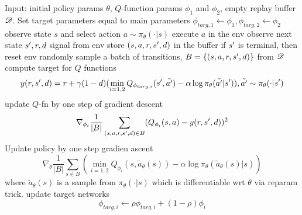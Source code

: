 \documentclass{article}
\begin{document}
\begin{algorithmic}
\STATE Input: initial policy params $\theta$, $Q$-function params 
$\phi_1$ and $\phi_2$, empty replay buffer $\mathscr{D}$.
\STATE Set target parameters equal to main parameters 
    $\phi_{targ,1}\leftarrow \phi_1, \phi_{targ,2}\leftarrow \phi_2$
\REPEAT
    \STATE observe state $s$ and select action 
    $a\sim\pi_{\theta}(\cdot|s)$
    \STATE execute $a$ in the env
    \STATE observe next state $s^{\prime}, r, d$ signal from env
    \STATE store $(s,a,r,s^{\prime},d)$ in the buffer
    \STATE if $s^{\prime}$ is terminal, then reset env
            \STATE randomly sample a batch of transitions, 
            $B=\{(s,a,r,s^{\prime},d)\}$ from $\mathscr{D}$
            \STATE compute target for $Q$ functions
            \[
                y(r,s^{\prime},d) = r + \gamma(1-d)(\min_{i=1,2}
                Q_{\phi_{targ,i}}(s^{\prime},\tilde{a^{\prime}})
                - \alpha \log \pi_{\theta}(\tilde{a^{\prime}}|s^{\prime})),
                \tilde {a^{\prime}} \sim \pi_{\theta}(\cdot|s^{\prime})
            \]
            \STATE update $Q$-fn by one step of gradient descent
            \[
                \nabla_{\phi_i}\frac{1}{|B|}
                \sum_{(s,a,r,s^{\prime},d)\in B}
                (Q_{\phi_i}(s,a) - y(r,s^{\prime},d))^2
            \]
            \STATE Update policy by one step gradien ascent
            \[
                \nabla_{\theta}\frac{1}{|B|}
                \sum_{s\in B}(\min_{i=1,2}
                Q_{\phi_i}(s,\tilde a_{\theta}(s)) - 
                \alpha\log\pi_{\theta}(\tilde a_{\theta}(s)|s))
            \]
            where $\tilde a_{\theta}(s)$ is a sample from
            $\pi_{\theta}(\cdot|s)$ which is differentiable wrt $\theta$
            via reparam trick.
            \STATE update target networks
            \[
                \phi_{targ,i}\leftarrow \rho\phi_{targ,i} + 
                (1-\rho)\phi_i
            \]
        \ENDFOR
    \ENDIF
{}
\end{algorithmic}
\end{document}
